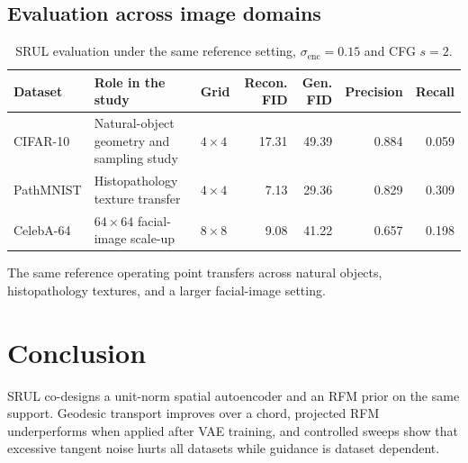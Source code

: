 \documentclass{article}
\begin{document}
\subsection*{Evaluation across image domains}
\begin{table}[H]
\centering
\scriptsize
\caption{SRUL evaluation under the same reference setting, $\sigma_{\mathrm{enc}}=0.15$ and CFG $s=2$.}
\label{tab:domains}
\setlength{\tabcolsep}{2.8pt}
\renewcommand{\arraystretch}{1.08}
\begin{tabular}{p{1.25cm}p{3.0cm}p{1.1cm}rrrr}
\toprule
Dataset & Role in the study & Grid & Recon. FID & Gen. FID & Precision & Recall \\
\midrule
CIFAR-10 & Natural-object geometry and sampling study & $4\times4$ & 17.31 & 49.39 & 0.884 & 0.059 \\
PathMNIST & Histopathology texture transfer & $4\times4$ & 7.13 & 29.36 & 0.829 & 0.309 \\
CelebA-64 & $64\times64$ facial-image scale-up & $8\times8$ & 9.08 & 41.22 & 0.657 & 0.198 \\
\bottomrule
\end{tabular}
\end{table}
The same reference operating point transfers across natural objects, histopathology textures, and a larger facial-image setting.

\section{Conclusion}
SRUL co-designs a unit-norm spatial autoencoder and an RFM prior on the same support. Geodesic transport improves over a chord, projected RFM underperforms when applied after VAE training, and controlled sweeps show that excessive tangent noise hurts all datasets while guidance is dataset dependent.
\end{document}
